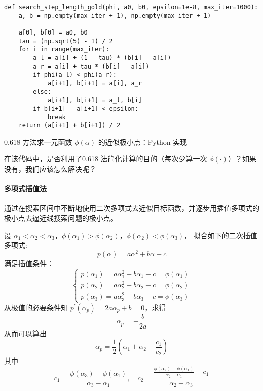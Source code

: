 \documentclass[cn]{elegantpaper}
\begin{document}
\begin{listing}[H]
    \begin{verbatim}
def search_step_length_gold(phi, a0, b0, epsilon=1e-8, max_iter=1000):
    a, b = np.empty(max_iter + 1), np.empty(max_iter + 1)

    a[0], b[0] = a0, b0
    tau = (np.sqrt(5) - 1) / 2
    for i in range(max_iter):
        a_l = a[i] + (1 - tau) * (b[i] - a[i])
        a_r = a[i] + tau * (b[i] - a[i])
        if phi(a_l) < phi(a_r):
            a[i+1], b[i+1] = a[i], a_r
        else:
            a[i+1], b[i+1] = a_l, b[i]
        if b[i+1] - a[i+1] < epsilon:
            break
    return (a[i+1] + b[i+1]) / 2
    \end{verbatim}
    \caption{0.618 方法求一元函数 $\phi\left(\alpha\right)$ 的近似极小点：Python 实现}
\end{listing}

\begin{remark}
    在该代码中，是否利用了0.618 法简化计算的目的（每次少算一次 $\phi\left(\cdot\right)$）？如果没有，我们应该怎么解决呢？
\end{remark}

\paragraph{多项式插值法}

通过在搜索区间中不断地使用二次多项式去近似目标函数，并逐步用插值多项式的极小点去逼近线搜索问题的极小点。

设 $\alpha_{1}<\alpha_{2}<\alpha_{3}$，$\phi\left(\alpha_{1}\right)>\phi\left(\alpha_{2}\right)$，$\phi\left(\alpha_{2}\right)<\phi\left(\alpha_{3}\right)$， 拟合如下的二次插值多项式:
\begin{equation}
    p(\alpha)=a\alpha^{2}+b\alpha+c
\end{equation}
满足插值条件：
\begin{equation}
    \left\{\begin{array}{l}
        p\left(\alpha_{1}\right)=a\alpha_{1}^{2}+b\alpha_{1}+c=\phi\left(\alpha_{1}\right) \\
        p\left(\alpha_{2}\right)=a\alpha_{2}^{2}+b\alpha_{2}+c=\phi\left(\alpha_{2}\right) \\
        p\left(\alpha_{3}\right)=a\alpha_{3}^{2}+b\alpha_{3}+c=\phi\left(\alpha_{3}\right)
    \end{array}\right.
\end{equation}
从极值的必要条件知 $p^{\prime}(\alpha_{p})=2a\alpha_{p}+b=0$，求得
\begin{equation}
    \alpha_{p}=-\frac{b}{2a}
\end{equation}
从而可以算出
\begin{equation}
    \alpha_{p}=\frac{1}{2}\left(\alpha_{1}+\alpha_{2}-\frac{c_{1}}{c_{2}}\right)
\end{equation}
其中
\begin{equation}
    c_{1}=\frac{\phi\left(\alpha_{3}\right)-\phi\left(\alpha_{1}\right)}{\alpha_{3}-\alpha_{1}},\quad c_{2}=\frac{\frac{\phi\left(\alpha_{2}\right)-\phi\left(\alpha_{1}\right)}{\alpha_{2}-\alpha_{1}}-c_{1}}{\alpha_{2}-\alpha_{3}}
\end{equation}
\end{document}
